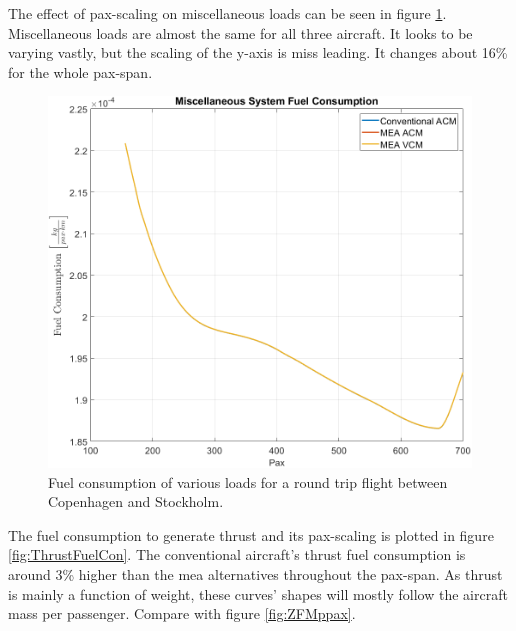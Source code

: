 \documentclass[english]{kththesis}
\begin{document}
\clearpage

The effect of pax-scaling on miscellaneous loads can be seen in figure \ref{fig:MiscFuelCon}. Miscellaneous loads are almost the same for all three aircraft. It looks to be varying vastly, but the scaling of the y-axis is miss leading. It changes about 16\% for the whole pax-span.

\begin{figure}[!ht]
    \centering
    \includegraphics[width=1\textwidth]{Epictures/MiscFuelCon.png}
    \caption{Fuel consumption of various loads for a round trip flight between Copenhagen and Stockholm.}
    \label{fig:MiscFuelCon}
\end{figure}

\clearpage

The fuel consumption to generate thrust and its pax-scaling is plotted in figure \ref{fig:ThrustFuelCon}. The conventional aircraft's thrust fuel consumption is around 3\% higher than the \acrshort{mea} alternatives throughout the pax-span. As thrust is mainly a function of weight, these curves' shapes will mostly follow the aircraft mass per passenger. Compare with figure \ref{fig:ZFMppax}.
\end{document}
